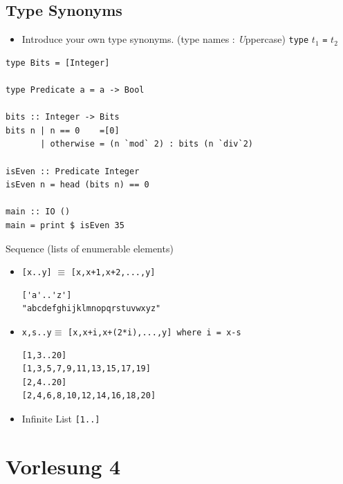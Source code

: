 \documentclass{article}
\newcommand{\Haskell}[1]{\texttt{#1}}
\begin{document}
\subsection{Type Synonyms}
\begin{itemize}
\item Introduce your own type synonyms. (type names : {\em U}ppercase)
\Haskell{type} $t_1$ \Haskell{=} $t_2$
\end{itemize}
\begin{verbatim}
type Bits = [Integer]

type Predicate a = a -> Bool

bits :: Integer -> Bits
bits n | n == 0    =[0]
       | otherwise = (n `mod` 2) : bits (n `div`2)

isEven :: Predicate Integer
isEven n = head (bits n) == 0

main :: IO ()
main = print $ isEven 35
\end{verbatim}
Sequence (lists of enumerable elements)
\begin{itemize}
\item \Haskell{[x..y]} $\equiv$ \Haskell{[x,x+1,x+2,...,y]}

\begin{verbatim}
['a'..'z']
"abcdefghijklmnopqrstuvwxyz"
\end{verbatim}
\item \Haskell{x,s..y}$\equiv$ \Haskell{[x,x+i,x+(2*i),...,y] where i = x-s}

\begin{verbatim}
[1,3..20]
[1,3,5,7,9,11,13,15,17,19]
[2,4..20]
[2,4,6,8,10,12,14,16,18,20]
\end{verbatim}
\item Infinite List \Haskell{[1..]}
\end{itemize}
\section{Vorlesung 4}
\end{document}
